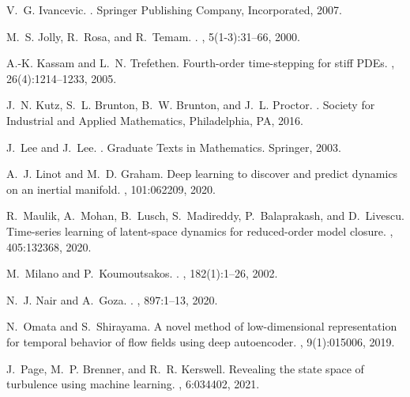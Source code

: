 \documentclass[preprint,aps,pre,letterpaper,onecolumn,superscriptaddress]{revtex4-2} %
\begin{document}
\begin{thebibliography}{10}
V.~G. Ivancevic.
.
\newblock Springer Publishing Company, Incorporated, 2007.

M.~S. Jolly, R.~Rosa, and R.~Temam.
.
, 5(1-3):31--66, 2000.

A.-K. Kassam and L.~N. Trefethen.
\newblock Fourth-order time-stepping for stiff {PDE}s.
, 26(4):1214--1233, 2005.

J.~N. Kutz, S.~L. Brunton, B.~W. Brunton, and J.~L. Proctor.
.
\newblock Society for Industrial and Applied Mathematics, Philadelphia, PA,
  2016.

J.~Lee and J.~Lee.
.
\newblock Graduate Texts in Mathematics. Springer, 2003.

A.~J. Linot and M.~D. Graham.
\newblock Deep learning to discover and predict dynamics on an inertial
  manifold.
, 101:062209, 2020.

R.~Maulik, A.~Mohan, B.~Lusch, S.~Madireddy, P.~Balaprakash, and D.~Livescu.
\newblock Time-series learning of latent-space dynamics for reduced-order model
  closure.
, 405:132368, 2020.

M.~Milano and P.~Koumoutsakos.
.
, 182(1):1--26, 2002.

N.~J. Nair and A.~Goza.
.
, 897:1--13, 2020.

N.~Omata and S.~Shirayama.
\newblock A novel method of low-dimensional representation for temporal
  behavior of flow fields using deep autoencoder.
, 9(1):015006, 2019.

J.~Page, M.~P. Brenner, and R.~R. Kerswell.
\newblock Revealing the state space of turbulence using machine learning.
, 6:034402, 2021.


\end{thebibliography}
\end{document}
